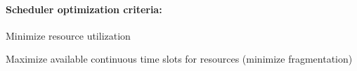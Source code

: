 

\paragraph{Scheduler optimization criteria:}
\begin{compactitem}
\item Minimize resource utilization
\item Maximize available continuous time slots for resources (minimize 
  fragmentation)
\end{compactitem}
